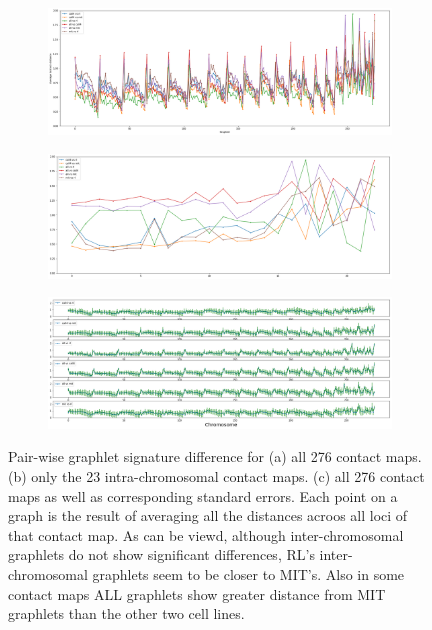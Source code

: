 \documentclass[a4,center,fleqn]{NAR}
\begin{document}
\begin{figure}[t]
    \centering
    \begin{subfigure}[b]{\textwidth}
        \includegraphics[width=\textwidth]{figures/orbit-distances_all.png}
        \caption{}
        \label{fig:orbit-distances_all}
    \end{subfigure}

    \begin{subfigure}[b]{\textwidth}
        \includegraphics[width=\textwidth]{figures/orbit-distances_intra.png}
        \caption{}
        \label{fig:orbit-distances_intra}
    \end{subfigure}
    \begin{subfigure}[b]{\textwidth}
        \includegraphics[width=\textwidth]{figures/orbit-distances_intra_separate.png}
        \caption{}
        \label{fig:orbit-distances_intra_separate}
    \end{subfigure}
    \caption{   Pair-wise graphlet signature difference for
                (a) all 276 contact maps.
                (b) only the 23 intra-chromosomal contact maps.
                (c) all 276 contact maps as well as corresponding
                standard errors.
                Each point on a graph is the result of averaging all
                the distances acroos all loci of that contact map.
                As can be viewd, although inter-chromosomal graphlets 
                do not show significant differences, RL's inter-chromosomal
                graphlets seem to be closer to MIT's. Also in some contact
                maps ALL graphlets show greater distance from MIT graphlets
                than the other two cell lines.
             }
    \label{fig:orbit-distances}
\end{figure}
\end{document}
